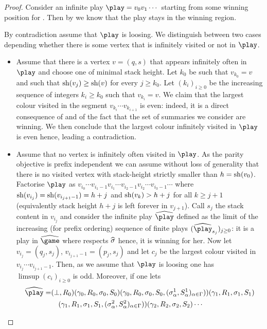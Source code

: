\begin{proof}
	Consider an infinite play $\play=v_0v_1\cdots$ starting from some winning position for \Eve. Then by  we know that the play stays in the winning region. 
	
	By contradiction assume that $\play$ is loosing. We distinguish between two cases depending whether there is some vertex that is infinitely visited or not in $\play$. 
	\begin{itemize}
		\item Assume that there is a vertex $v=(q,s)$ that appears infinitely often in $\play$ and choose one of minimal stack height. Let $k_0$ be such that $v_{k_0}=v$ and such that $\mathrm{sh}(v_j)\geq \mathrm{sh}(v)$ for every $j\geq k_0$. Let $(k_i)_{i\geq 0}$ be the increasing sequence of integers $k_i\geq k_0$ such that $v_{k_i}=v$. We claim that the largest colour visited in the segment $v_{k_i}\cdots v_{k_{i+1}}$ is even: indeed, it is a direct consequence of  and of the fact that the set of summaries we consider are winning. We then conclude that the largest colour infinitely visited in $\play$ is even hence, leading a contradiction.
		\item Assume that no vertex is infinitely often visited in $\play$. As the parity objective is prefix independent we can assume without loss of generality that there is no visited vertex with stack-height strictly smaller than $h=\mathrm{sh}(v_0)$. 
			Factorise $\play$ as $v_{i_0}\cdots v_{i_1-1}v_{i_1}\cdots v_{i_2-1}v_{i_2}\cdots v_{i_3-1}\cdots$ where $\mathrm{sh}(v_{i_j})=\mathrm{sh}(v_{i_{j+1}-1})=h+j$ and $\mathrm{sh}(v_k)>h+j$ for all $k\geq j+1$ (equivalently stack height $h+j$ is left forever in $v_{j+1}$). Call $s_j$ the stack content in $v_{i_j}$ and consider the infinite play $\hplay$ defined as the limit of the increasing (for prefix ordering) sequence of finite plays $(\hplay_{s_j})_{j\geq 0}$: it is a play in $\hgame$ where \Eve respects $\widehat{\sigma}$ hence, it is winning for her. 
			Now let $v_{i_j}=(q_j,s_j)$, $v_{i_{j+1}-1}=(p_j,s_j)$ and let $c_j$ be the largest colour visited in $v_{i_j}\cdots v_{i_{j+1}-1}$. Then, as we assume that $\play$ is loosing one has $\limsup(c_i)_{i\geq 0}$ is odd. Moreover, if one lets \begin{equation*}
\begin{split}
\hplay = & (\bot,R_0)(\gamma_0,R_0,\sigma_0,S_0)(\gamma_0,R_0,\sigma_0,S_0,(\sigma^1_\alpha,S^1_\alpha)_{\alpha\in\Gamma}))(\gamma_1,R_1,\sigma_1,S_1)\\ &\quad (\gamma_1,R_1,\sigma_1,S_1,(\sigma^2_\alpha,S^2_\alpha)_{\alpha\in\Gamma}))(\gamma_2,R_2,\sigma_2,S_2)\cdots	

\end{split}
\end{equation*}
\end{itemize}
\end{proof}
